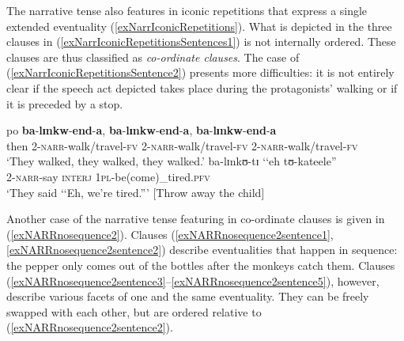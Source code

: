 The narrative tense also features in iconic repetitions that express a single extended eventuality (\ref{exNarrIconicRepetitions}). What is depicted in the three clauses in (\ref{exNarrIconicRepetitionsSentences1}) is not internally ordered. These clauses are thus classified as \textit{co-ordinate clauses}. The case of (\ref{exNarrIconicRepetitionsSentence2}) presents more difficulties: it is not entirely clear if the speech act depicted takes place during the protagonists' walking or if it is preceded by a stop.

\begin{exe}
\ex \label{exNarrIconicRepetitions}
\begin{xlist}
\ex \label{exNarrIconicRepetitionsSentences1} \gll po \textbf{ba}-\textbf{lɪnkw}-\textbf{end}-\textbf{a}, \textbf{ba}-\textbf{lɪnkw}-\textbf{end}-\textbf{a}, \textbf{ba}-\textbf{lɪnkw}-\textbf{end}-\textbf{a}\\
then 2-\textsc{narr}-walk/travel-\textsc{fv} 2-\textsc{narr}-walk/travel-\textsc{fv} 2-\textsc{narr}-walk/travel-\textsc{fv}\\
\glt \lq They walked, they walked, they walked.'
\ex \label{exNarrIconicRepetitionsSentence2} \gll ba-lɪnkʊ-tɪ \textup{\lq\lq}eh tʊ-kateele\textup{''}\\
2-\textsc{narr}-say \phantom{\lq\lq}\textsc{interj} \textsc{1pl}-be(come)\_tired.\textsc{pfv}\\
\glt \lq They said \lq\lq Eh, we're tired.''{}' [Throw away the child]
\end{xlist}
\end{exe}

Another case of the narrative tense featuring in co-ordinate clauses is given in
(\ref{exNARRnosequence2}). Clauses (\ref{exNARRnosequence2sentence1}, \ref{exNARRnosequence2sentence2}) describe eventualities that happen in sequence: the pepper only comes out of the bottles after the monkeys catch them. Clauses (\ref{exNARRnosequence2sentence3}--\ref{exNARRnosequence2sentence5}), however, describe various facets of one and the same eventuality. They can be freely swapped with each other, but are ordered relative to (\ref{exNARRnosequence2sentence2}).

